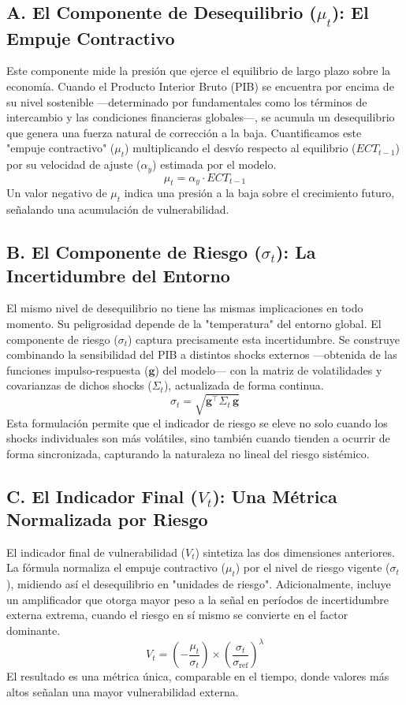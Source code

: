 \documentclass[11pt,a4paper]{article}
\newcommand{\vect}[1]{\boldsymbol{#1}}
\begin{document}
\subsection*{A. El Componente de Desequilibrio ($\mu_t$): El Empuje Contractivo}
Este componente mide la presión que ejerce el equilibrio de largo plazo sobre la economía. Cuando el Producto Interior Bruto (PIB) se encuentra por encima de su nivel sostenible —determinado por fundamentales como los términos de intercambio y las condiciones financieras globales—, se acumula un desequilibrio que genera una fuerza natural de corrección a la baja. Cuantificamos este "empuje contractivo" ($\mu_t$) multiplicando el desvío respecto al equilibrio ($ECT_{t-1}$) por su velocidad de ajuste ($\alpha_y$) estimada por el modelo.
\begin{equation}
\mu_t = \alpha_y \cdot ECT_{t-1}
\end{equation}
Un valor negativo de $\mu_t$ indica una presión a la baja sobre el crecimiento futuro, señalando una acumulación de vulnerabilidad.

\subsection*{B. El Componente de Riesgo ($\sigma_t$): La Incertidumbre del Entorno}
El mismo nivel de desequilibrio no tiene las mismas implicaciones en todo momento. Su peligrosidad depende de la "temperatura" del entorno global. El componente de riesgo ($\sigma_t$) captura precisamente esta incertidumbre. Se construye combinando la sensibilidad del PIB a distintos shocks externos —obtenida de las funciones impulso-respuesta ($\vect{g}$) del modelo— con la matriz de volatilidades y covarianzas de dichos shocks ($\Sigma_t$), actualizada de forma continua.
\begin{equation}
\sigma_t = \sqrt{\vect{g}^\top \Sigma_t\, \vect{g}}
\end{equation}
Esta formulación permite que el indicador de riesgo se eleve no solo cuando los shocks individuales son más volátiles, sino también cuando tienden a ocurrir de forma sincronizada, capturando la naturaleza no lineal del riesgo sistémico.

\subsection*{C. El Indicador Final ($V_t$): Una Métrica Normalizada por Riesgo}
El indicador final de vulnerabilidad ($V_t$) sintetiza las dos dimensiones anteriores. La fórmula normaliza el empuje contractivo ($\mu_t$) por el nivel de riesgo vigente ($\sigma_t$), midiendo así el desequilibrio en "unidades de riesgo". Adicionalmente, incluye un amplificador que otorga mayor peso a la señal en períodos de incertidumbre externa extrema, cuando el riesgo en sí mismo se convierte en el factor dominante.
\begin{equation}
V_t = \left(-\frac{\mu_t}{\sigma_t}\right) \times \left(\frac{\sigma_t}{\sigma_{\text{ref}}}\right)^\lambda
\end{equation}
El resultado es una métrica única, comparable en el tiempo, donde valores más altos señalan una mayor vulnerabilidad externa.
\end{document}

